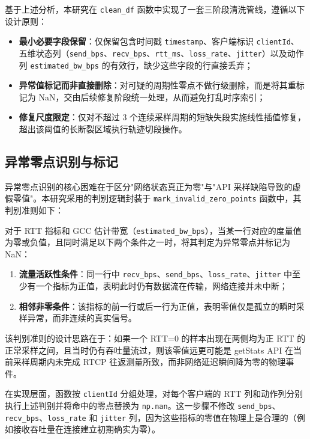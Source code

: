 基于上述分析，本研究在 \texttt{clean\_df} 函数中实现了一套三阶段清洗管线，遵循以下设计原则：

\begin{itemize}
    \item \textbf{最小必要字段保留}：仅保留包含时间戳 \texttt{timestamp}、客户端标识 \texttt{clientId}、五维状态列（\texttt{send\_bps}、\texttt{recv\_bps}、\texttt{rtt\_ms}、\texttt{loss\_rate}、\texttt{jitter}）以及动作列 \texttt{estimated\_bw\_bps} 的有效行，缺少这些字段的行直接丢弃；
    \item \textbf{异常值标记而非直接删除}：对可疑的周期性零点不做行级删除，而是将其重标记为 NaN，交由后续修复阶段统一处理，从而避免打乱时序索引；
    \item \textbf{修复尺度限定}：仅对不超过 3 个连续采样周期的短缺失段实施线性插值修复，超出该阈值的长断裂区域执行轨迹切段操作。
\end{itemize}

\subsection{异常零点识别与标记}

异常零点识别的核心困难在于区分"网络状态真正为零"与"API 采样缺陷导致的虚假零值"。本研究采用的判别逻辑封装于 \texttt{mark\_invalid\_zero\_points} 函数中，其判别准则如下：

对于 RTT 指标和 GCC 估计带宽（\texttt{estimated\_bw\_bps}），当某一行对应的度量值为零或负值，且同时满足以下两个条件之一时，将其判定为异常零点并标记为 NaN：

\begin{enumerate}
    \item \textbf{流量活跃性条件}：同一行中 \texttt{recv\_bps}、\texttt{send\_bps}、\texttt{loss\_rate}、\texttt{jitter} 中至少有一个指标为正值，表明此时仍有数据流在传输，网络连接并未中断；
    \item \textbf{相邻非零条件}：该指标的前一行或后一行为正值，表明零值仅是孤立的瞬时采样异常，而非连续的真实信号。
\end{enumerate}

该判别准则的设计思路在于：如果一个 RTT=0 的样本出现在两侧均为正 RTT 的正常采样之间，且当时仍有吞吐量流过，则该零值远更可能是 getStats API 在当前采样周期内未完成 RTCP 往返测量所致，而非网络延迟瞬间降为零的物理事件。

在实现层面，函数按 \texttt{clientId} 分组处理，对每个客户端的 RTT 列和动作列分别执行上述判别并将命中的零点替换为 \texttt{np.nan}。这一步骤不修改 \texttt{send\_bps}、\texttt{recv\_bps}、\texttt{loss\_rate} 和 \texttt{jitter} 列，因为这些指标的零值在物理上是合理的（例如接收吞吐量在连接建立初期确实为零）。

